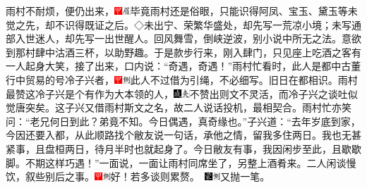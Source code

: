 雨村不耐烦，便仍出来，{\includegraphics[width=3mm]{../Images/00002}\includegraphics[width=3mm]{../Images/00010}\footnotesize \kaishu 毕竟雨村还是俗眼，只能识得阿凤、宝玉、黛玉等未觉之先，却不识得既证之后。◇未出宁、荣繁华盛处，却先写一荒凉小境；未写通部入世迷人，却先写一出世醒人。回风舞雪，倒峡逆波，别小说中所无之法。}意欲到那村肆中沽酒三杯，以助野趣。于是款步行来，刚入肆门，只见座上吃酒之客有一人起身大笑，接了出来，口内说：``奇遇，奇遇！''雨村忙看时，此人是都中古董行中贸易的号冷子兴者，{\includegraphics[width=3mm]{../Images/00002}\includegraphics[width=3mm]{../Images/00011}\footnotesize \kaishu 此人不过借为引绳，不必细写。}旧日在都相识。雨村最赞这冷子兴是个有作为大本领的人，{\includegraphics[width=3mm]{../Images/00005}\includegraphics[width=3mm]{../Images/00012}\footnotesize \kaishu 不赞出则文不灵活，而冷子兴之谈吐似觉唐突矣。}这子兴又借雨村斯文之名，故二人说话投机，最相契合。雨村忙亦笑问：``老兄何日到此？弟竟不知。今日偶遇，真奇缘也。''子兴道：``去年岁底到家，今因还要入都，从此顺路找个敝友说一句话，承他之情，留我多住两日。我也无甚紧事，且盘桓两日，待月半时也就起身了。今日敝友有事，我因闲步至此，且歇歇脚。不期这样巧遇！''一面说，一面让雨村同席坐了，另整上酒肴来。二人闲谈慢饮，叙些别后之事。{{\includegraphics[width=3mm]{../Images/00002}\includegraphics[width=3mm]{../Images/00011}\footnotesize \kaishu 好！若多谈则累赘。　}\includegraphics[width=3mm]{../Images/00006}\includegraphics[width=3mm]{../Images/00011}\footnotesize \kaishu 又抛一笔。}


